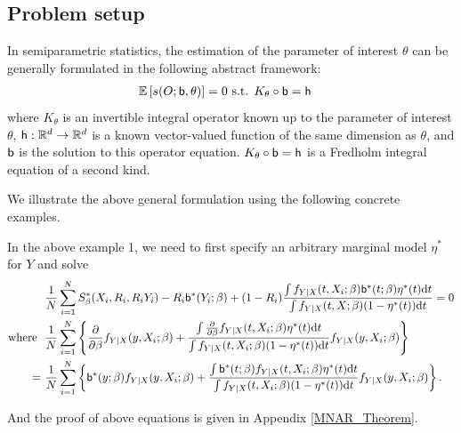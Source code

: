 \documentclass[11pt]{article}
\begin{document}
\subsection{Problem setup}
\label{sec:problem}

In semiparametric statistics, the estimation of the parameter of interest $\theta$ can be generally formulated in the following abstract framework:
\begin{equation} \label{general form: pop}
    \begin{split}
        & {\mathbb{E}} \left[ s (O; {\mathsf{b}}, \theta) \right] = 0 \text{ s.t. } K_{\theta} \circ {\mathsf{b}} = {\mathsf{h}}
    \end{split}
\end{equation}
where $K_{\theta}$ is an invertible integral operator known up to the parameter of interest $\theta$, ${\mathsf{h}}: {\mathbb{R}}^{d} \rightarrow {\mathbb{R}}^{d}$ is a known vector-valued function of the same dimension as $\theta$, and ${\mathsf{b}}$ is the solution to this operator equation. $K_{\theta} \circ {\mathsf{b}} = {\mathsf{h}}$ is a Fredholm integral equation of a second kind.

We illustrate the above general formulation using the following concrete examples.

\begin{example1}[continued]
In the above example 1, we need to first specify an arbitrary marginal model $\eta^{\ast}$ for $Y$ and solve
\begin{equation}
\label{key}
\begin{split}
& \ \frac{1}{N} \sum_{i = 1}^{N} S_{\beta}^{\ast} (X_{i}, R_{i}, R_{i} Y_{i}) - R_{i} {\mathsf{b}}^{\ast} (Y_{i}; \beta) + (1 - R_{i}) \frac{\int f_{Y | X} (t, X_{i}; \beta) {\mathsf{b}}^{\ast} (t; \beta) \eta^{\ast} (t) \mathrm{d} t}{\int f_{Y | X} (t, X; \beta) (1 - \eta^{\ast} (t)) \mathrm{d} t} = 0 \\
\text{where } & \ \frac{1}{N} \sum_{i = 1}^{N} \left\{ \frac{\partial}{\partial \beta} f_{Y | X} (y, X_{i}; \beta) + \frac{\int \frac{\partial}{\partial \beta} f_{Y | X} (t, X_{i}; \beta) \eta^{\ast} (t) \mathrm{d} t}{\int f_{Y | X} (t, X_{i}; \beta) (1 - \eta^{\ast} (t)) \mathrm{d} t} f_{Y | X} (y, X_{i}; \beta) \right\} \\
= & \ \frac{1}{N} \sum_{i = 1}^{N} \left\{{\mathsf{b}}^{\ast} (y; \beta) f_{Y | X} (y, X_{i}; \beta) + \frac{\int {\mathsf{b}}^{\ast} (t; \beta) f_{Y | X} (t, X_{i}; \beta) \eta^{\ast} (t) \mathrm{d} t}{\int f_{Y | X} (t, X_{i}; \beta) (1 - \eta^{\ast} (t)) \mathrm{d} t} f_{Y | X} (y, X_{i}; \beta) \right\}.
\end{split}
\end{equation}

And the proof of above equations is given in Appendix \ref{MNAR_Theorem}.
\end{example1}
\end{document}
